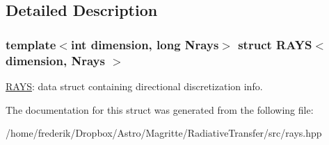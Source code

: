\subsection{Detailed Description}
\subsubsection*{template$<$int dimension, long Nrays$>$\newline
struct R\+A\+Y\+S$<$ dimension, Nrays $>$}

\mbox{\hyperlink{structRAYS}{R\+A\+YS}}\+: data struct containing directional discretization info. 

The documentation for this struct was generated from the following file\+:\begin{DoxyCompactItemize}
\item 
/home/frederik/\+Dropbox/\+Astro/\+Magritte/\+Radiative\+Transfer/src/rays.\+hpp\end{DoxyCompactItemize}
